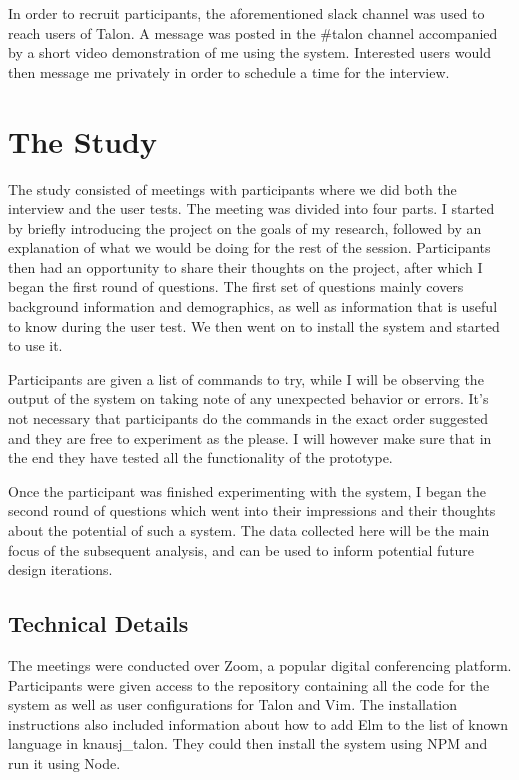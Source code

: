 \documentclass[../thesis.tex]{subfiles}
\begin{document}
In order to recruit participants, the aforementioned slack channel was used to reach users of Talon.
A message was posted in the \#talon channel accompanied by a short video demonstration of me using the system.
Interested users would then message me privately in order to schedule a time for the interview.

\section{The Study}
The study consisted of meetings with participants where we did both the interview and the user tests.
The meeting was divided into four parts.
I started by briefly introducing the project on the goals of my research, followed by an explanation of what we would be doing for
the rest of the session.
Participants then had an opportunity to share their thoughts on the project, after which I began the first round of questions.
The first set of questions mainly covers background information and demographics, as well as information that is useful to know
during the user test.
We then went on to install the system and started to use it.

Participants are given a list of commands to try, while I will be observing
the output of the system on taking note of any unexpected behavior or errors.
It's not necessary that participants do the commands in the exact order suggested and they are free to experiment as the please.
I will however make sure that in the end they have tested all the functionality of the prototype.

Once the participant was finished experimenting with the system, I began the second round of questions
which went into their impressions and their thoughts about the potential of such a system.
The data collected here will be the main focus of the subsequent analysis, and can be used to
inform potential future design iterations.

\subsection{Technical Details}
The meetings were conducted over Zoom, a popular digital conferencing platform.
Participants were given access to the repository containing all the code for the system
as well as user configurations for Talon and Vim.
The installation instructions also included information about how to add Elm to the list of known language in knausj\_talon.
They could then install the system using NPM and run it using Node.
\end{document}
